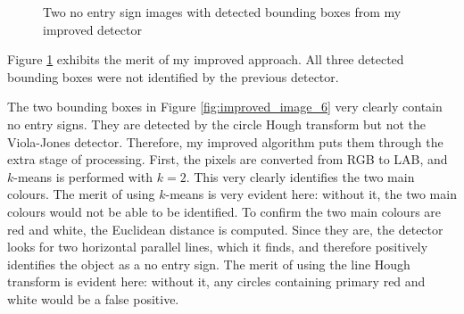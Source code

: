 \documentclass[twocolumn, 10pt, a4paper]{article}
\begin{document}
\begin{figure}[H]
  \vspace{-4.5em}
  \centering
  \hfill
  \hfill
  \caption{Two no entry sign images with detected bounding boxes from my improved detector}\label{fig:improved_images}
\end{figure}

Figure \ref{fig:improved_images} exhibits the merit of my improved approach.
All three detected bounding boxes were not identified by the previous detector.

The two bounding boxes in Figure \ref{fig:improved_image_6} very clearly contain no entry signs.
They are detected by the circle Hough transform but not the Viola-Jones detector.
Therefore, my improved algorithm puts them through the extra stage of processing.
First, the pixels are converted from RGB to LAB, and $k$-means is performed with $k = 2$.
This very clearly identifies the two main colours.
The merit of using $k$-means is very evident here: without it, the two main colours would not be able to be identified.
To confirm the two main colours are red and white, the Euclidean distance is computed.
Since they are, the detector looks for two horizontal parallel lines, which it finds, and therefore positively identifies the object as a no entry sign.
The merit of using the line Hough transform is evident here: without it, any circles containing primary red and white would be a false positive.
\end{document}
